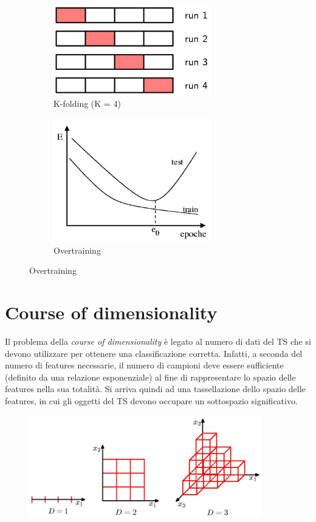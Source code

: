 \documentclass[a4paper,oneside,titlepage]{book}
\begin{document}
\begin{figure}[htp]
	\begin{subfigure}{0.49\textwidth}
	    \centering
		\includegraphics[width=0.75\textwidth]{4-fold.png}
		\caption{K-folding (K = 4)}
	\end{subfigure}
	\hfill
	\begin{subfigure}{0.49\textwidth}
	    \centering
		\includegraphics[width=0.75\textwidth]{overtraining.png}
		\caption{Overtraining}
	\end{subfigure}
\end{figure}

\section{Course of dimensionality}
Il problema della \textit{course of dimensionality} è legato al numero di dati del TS che si devono utilizzare per ottenere una classificazione corretta. Infatti, a seconda del numero di features necessarie, il numero di campioni deve essere sufficiente (definito da una relazione
esponenziale) al fine di rappresentare lo spazio delle features nella sua totalità. Si arriva quindi ad una tassellazione dello spazio delle features, in cui gli oggetti del TS devono occupare un sottospazio significativo.
\begin{figure}[htp]
	\centering
	\includegraphics[width=0.9\textwidth]{tassellazione.png}
\end{figure}
\end{document}
